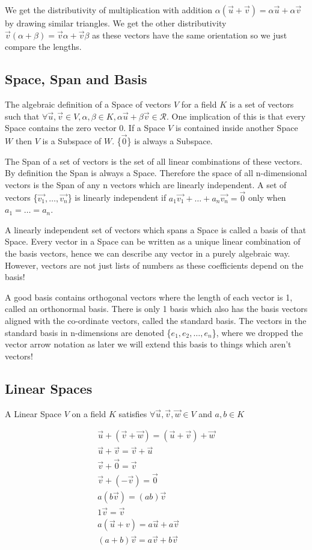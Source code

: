 \documentclass[options]{report}
\def \u{\vec{u}}
\def \v{\vec{v}}
\def \w{\vec{w}}
\begin{document}
We get the distributivity of multiplication with addition $\alpha (\u + \v) = \alpha \u + \alpha \v$ by drawing similar triangles. We get the other distributivity $\v (\alpha + \beta) = \v \alpha + \v \beta$
as these vectors have the same orientation so we just compare the lengths.

\subsection{Space, Span and Basis}
The algebraic definition of a Space of vectors $V$ for a field $K$ is a set of vectors such that $\forall \u, \v \in V, \alpha, \beta \in K, \alpha \u + \beta \v \in \mathcal{R}$. One implication of this is that every Space contains the zero vector $0$. If a Space $V$ is contained inside another Space $W$ then $V$ is a Subspace of $W$. \{$\vec{0}$\} is always a Subspace.

The Span of a set of vectors is the set of all linear combinations of these vectors. By definition the Span is always a Space. Therefore the space of all n-dimensional vectors is the Span of any n vectors which are linearly independent. A set of vectors \{$\vec{v_1}, \dots, \vec{v_n} $\} is linearly independent if $a_1 \vec{v_1} + \dots + a_n \vec{v_n} = \vec{0}$ only when $a_1 = \dots = a_n$.

A linearly independent set of vectors which spans a Space is called a basis of that Space. Every vector in a Space can be written as a unique linear combination of the basis vectors, hence we can describe any vector in a purely algebraic way. However, vectors are not just lists of numbers as these coefficients depend on the basis!

A good basis contains orthogonal vectors where the length of each vector is 1, called an orthonormal basis. There is only 1 basis which also has the basis vectors aligned with the co-ordinate vectors, called the standard basis. The vectors in the standard basis in n-dimensions are denoted \{$e_1, e_2, \dots, e_n$\}, where we dropped the vector arrow notation as later we will extend this basis to things which aren't vectors!

\subsection{Linear Spaces}
A Linear Space $V$ on a field $K$ satisfies $\forall \u, \v, \w \in V$ and $ a, b \in K$

\begin{equation}
	\begin{gathered}
	\u + (\v + \w) = (\u + \v) + \w \\
	\u + \v = \v + \u \\
	\v + \vec{0} = \v \\
	\v + (-\v) = \vec{0} \\
	a(b\v) = (ab)\v \\
	1\v = \v \\
	a(\u + v) = a\u + a\v \\
	(a + b)\v = a\v + b\v
	\end{gathered}
\end{equation}
\end{document}
